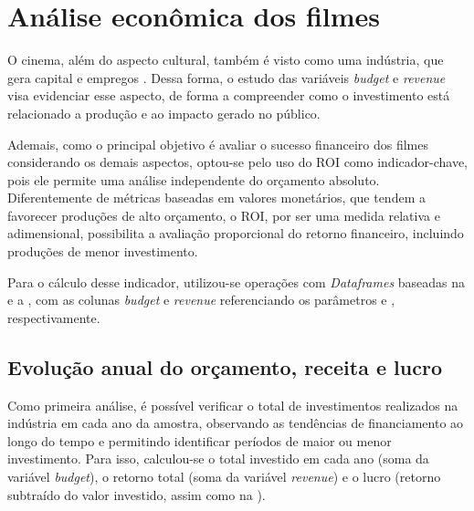 \section{Análise econômica dos filmes} \label{4-analise-economica}
O cinema, além do aspecto cultural, também é visto como uma indústria, que gera capital e empregos \cite{homenko2015}. Dessa forma, o estudo das variáveis \textit{budget} e \textit{revenue} visa evidenciar esse aspecto, de forma a compreender como o investimento está relacionado a produção e ao impacto gerado no público.

Ademais, como o principal objetivo é avaliar o sucesso financeiro dos filmes considerando os demais aspectos, optou-se pelo uso do \acrshort{ROI} como indicador-chave, pois ele permite uma análise independente do orçamento absoluto. Diferentemente de métricas baseadas em valores monetários, que tendem a favorecer produções de alto orçamento, o \acrshort{ROI}, por ser uma medida relativa e adimensional, possibilita a avaliação proporcional do retorno financeiro, incluindo produções de menor investimento.

Para o cálculo desse indicador, utilizou-se operações com \textit{Dataframes} baseadas na  e a , com as colunas \textit{budget} e \textit{revenue} referenciando os parâmetros  e , respectivamente. 


\subsection{Evolução anual do orçamento, receita e lucro}
Como primeira análise, é possível verificar o total de investimentos realizados na indústria em cada ano da amostra, observando as tendências de financiamento ao longo do tempo e permitindo identificar períodos de maior ou menor investimento. Para isso, calculou-se o total investido em cada ano (soma da variável \textit{budget}), o retorno total (soma da variável \textit{revenue}) e o lucro (retorno subtraído do valor investido, assim como na ).

